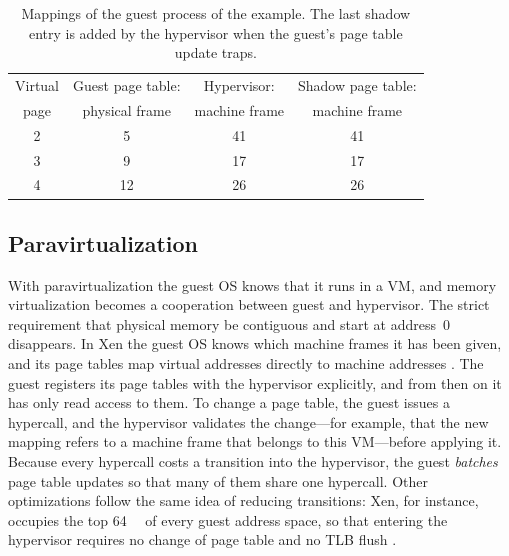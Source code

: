 \documentclass[../main.tex]{subfiles}
\begin{document}
\begin{table}[htbp]
  \centering
  \caption{Mappings of the guest process of the example.  The last shadow
    entry is added by the hypervisor when the guest's page table update
    traps.}
  \label{tab:l12-shadow}
  \small
  \begin{tabular}{@{}cccc@{}}
    \toprule
    Virtual & Guest page table: & Hypervisor: & Shadow page table: \\
    page & physical frame & machine frame & machine frame \\
    \midrule
    2 & 5  & 41 & 41 \\
    3 & 9  & 17 & 17 \\
    4 & 12 & 26 & 26 \\
    \bottomrule
  \end{tabular}
\end{table}

\subsection{Paravirtualization}

With paravirtualization the guest OS knows that it runs in a VM, and memory
virtualization becomes a cooperation between guest and hypervisor.  The
strict requirement that physical memory be contiguous and start at
address~0 disappears.  In Xen the guest OS knows which machine frames it
has been given, and its page tables map virtual addresses directly to
machine addresses \cite{barham2003}.  The guest registers its page tables
with the hypervisor explicitly, and from then on it has only read access to
them.  To change a page table, the guest issues a hypercall, and the
hypervisor validates the change---for example, that the new mapping refers
to a machine frame that belongs to this VM---before applying it.  Because
every hypercall costs a transition into the hypervisor, the guest
\emph{batches} page table updates so that many of them share one
hypercall.  Other optimizations follow the same idea of reducing
transitions: Xen, for instance, occupies the top \SI{64}{\mega\byte} of
every guest address space, so that entering the hypervisor requires no
change of page table and no TLB flush \cite{barham2003}.
\end{document}
